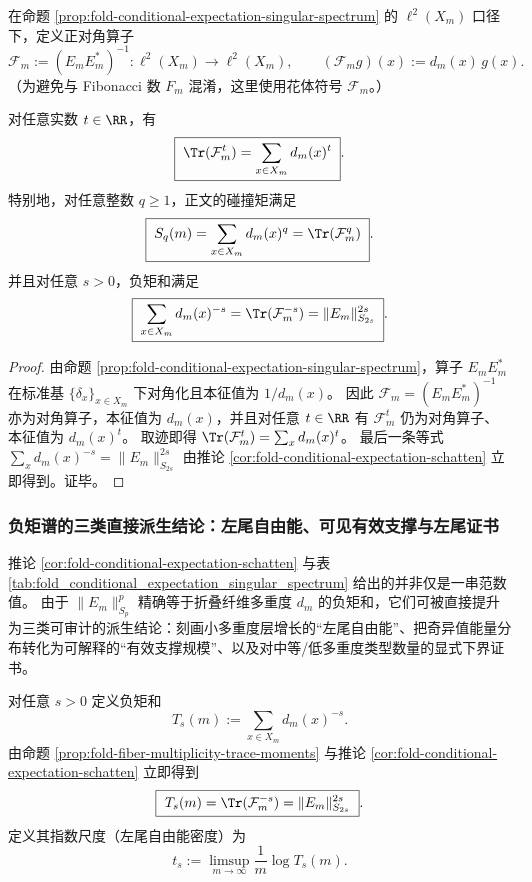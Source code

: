 \begin{definition}\label{def:fold-fiber-multiplicity-operator}
在命题 \ref{prop:fold-conditional-expectation-singular-spectrum} 的 \(\ell^2(X_m)\) 口径下，定义正对角算子
\[
\mathcal{F}_m:=(E_mE_m^\ast)^{-1}:\ell^2(X_m)\to\ell^2(X_m),
\qquad
(\mathcal{F}_m g)(x):=d_m(x)\,g(x).
\]
（为避免与 Fibonacci 数 \(F_m\) 混淆，这里使用花体符号 \(\mathcal{F}_m\)。）
\end{definition}

\begin{proposition}[空间矩与负矩的迹表示]\label{prop:fold-fiber-multiplicity-trace-moments}
对任意实数 \(t\in\RR\)，有
\[
\boxed{\;
\Tr(\mathcal{F}_m^{t})=\sum_{x\in X_m} d_m(x)^{t}\; }.
\]
特别地，对任意整数 \(q\ge 1\)，正文的碰撞矩满足
\[
\boxed{\;
S_q(m)=\sum_{x\in X_m}d_m(x)^q=\Tr(\mathcal{F}_m^{q})\; }.
\]
并且对任意 \(s>0\)，负矩和满足
\[
\boxed{\;
\sum_{x\in X_m}d_m(x)^{-s}=\Tr(\mathcal{F}_m^{-s})=\|E_m\|_{S_{2s}}^{2s}\; }.
\]
\end{proposition}
\begin{proof}
由命题 \ref{prop:fold-conditional-expectation-singular-spectrum}，算子 \(E_mE_m^\ast\) 在标准基 \(\{\delta_x\}_{x\in X_m}\) 下对角化且本征值为 \(1/d_m(x)\)。
因此 \(\mathcal{F}_m=(E_mE_m^\ast)^{-1}\) 亦为对角算子，本征值为 \(d_m(x)\)，并且对任意 \(t\in\RR\) 有 \(\mathcal{F}_m^t\) 仍为对角算子、本征值为 \(d_m(x)^t\)。
取迹即得 \(\Tr(\mathcal{F}_m^{t})=\sum_x d_m(x)^t\)。
最后一条等式 \(\sum_x d_m(x)^{-s}=\|E_m\|_{S_{2s}}^{2s}\) 由推论 \ref{cor:fold-conditional-expectation-schatten} 立即得到。证毕。
\end{proof}

\subsubsection{负矩谱的三类直接派生结论：左尾自由能、可见有效支撑与左尾证书}\label{app:op-algebra-negative-moment-consequences}

推论 \ref{cor:fold-conditional-expectation-schatten} 与表 \ref{tab:fold_conditional_expectation_singular_spectrum} 给出的并非仅是一串范数值。
由于 \(\|E_m\|_{S_p}^p\) 精确等于折叠纤维多重度 \(d_m\) 的负矩和，它们可被直接提升为三类可审计的派生结论：刻画小多重度层增长的“左尾自由能”、把奇异值能量分布转化为可解释的“有效支撑规模”、以及对中等/低多重度类型数量的显式下界证书。

\begin{definition}[负矩和与左尾自由能密度]\label{def:fold-negative-moment-sum-left-tail}
对任意 \(s>0\) 定义负矩和
\[
T_s(m):=\sum_{x\in X_m} d_m(x)^{-s}.
\]
由命题 \ref{prop:fold-fiber-multiplicity-trace-moments} 与推论 \ref{cor:fold-conditional-expectation-schatten} 立即得到
\[
\boxed{\ T_s(m)=\Tr(\mathcal{F}_m^{-s})=\|E_m\|_{S_{2s}}^{2s}\ }.
\]
定义其指数尺度（左尾自由能密度）为
\[
t_s:=\limsup_{m\to\infty}\frac{1}{m}\log T_s(m).
\]
\end{definition}

